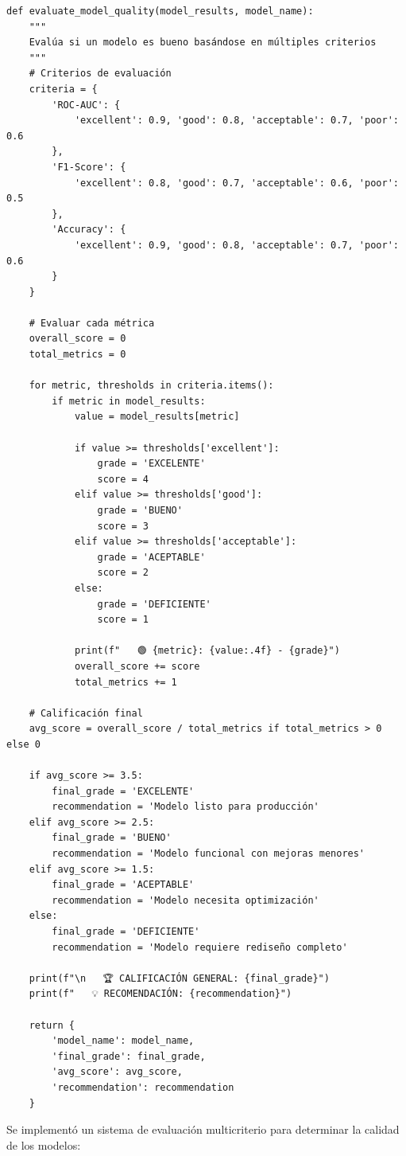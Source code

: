 \documentclass[12pt,letterpaper]{article}
\begin{document}
\begin{verbatim}
def evaluate_model_quality(model_results, model_name):
    """
    Evalúa si un modelo es bueno basándose en múltiples criterios
    """
    # Criterios de evaluación
    criteria = {
        'ROC-AUC': {
            'excellent': 0.9, 'good': 0.8, 'acceptable': 0.7, 'poor': 0.6
        },
        'F1-Score': {
            'excellent': 0.8, 'good': 0.7, 'acceptable': 0.6, 'poor': 0.5
        },
        'Accuracy': {
            'excellent': 0.9, 'good': 0.8, 'acceptable': 0.7, 'poor': 0.6
        }
    }
    
    # Evaluar cada métrica
    overall_score = 0
    total_metrics = 0
    
    for metric, thresholds in criteria.items():
        if metric in model_results:
            value = model_results[metric]
            
            if value >= thresholds['excellent']:
                grade = 'EXCELENTE'
                score = 4
            elif value >= thresholds['good']:
                grade = 'BUENO'
                score = 3
            elif value >= thresholds['acceptable']:
                grade = 'ACEPTABLE'
                score = 2
            else:
                grade = 'DEFICIENTE'
                score = 1
            
            print(f"   🟢 {metric}: {value:.4f} - {grade}")
            overall_score += score
            total_metrics += 1
    
    # Calificación final
    avg_score = overall_score / total_metrics if total_metrics > 0 else 0
    
    if avg_score >= 3.5:
        final_grade = 'EXCELENTE'
        recommendation = 'Modelo listo para producción'
    elif avg_score >= 2.5:
        final_grade = 'BUENO'
        recommendation = 'Modelo funcional con mejoras menores'
    elif avg_score >= 1.5:
        final_grade = 'ACEPTABLE'
        recommendation = 'Modelo necesita optimización'
    else:
        final_grade = 'DEFICIENTE'
        recommendation = 'Modelo requiere rediseño completo'
    
    print(f"\n   🏆 CALIFICACIÓN GENERAL: {final_grade}")
    print(f"   💡 RECOMENDACIÓN: {recommendation}")
    
    return {
        'model_name': model_name,
        'final_grade': final_grade,
        'avg_score': avg_score,
        'recommendation': recommendation
    }
\end{verbatim}

Se implementó un sistema de evaluación multicriterio para determinar la calidad de los modelos:
\end{document}
